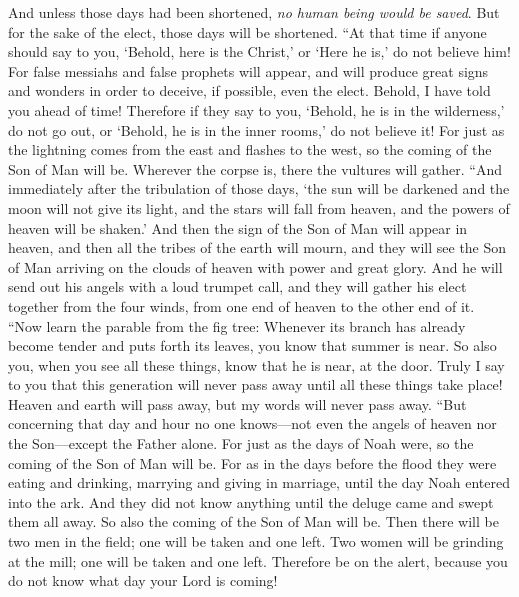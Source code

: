 \begin{biblechapter}
\verse And unless those days had been shortened, \textit{no human being would be saved}. But for the sake of the elect, those days will be shortened.
\verse “At that time if anyone should say to you, ‘Behold, here is the Christ,’ or ‘Here he is,’ do not believe him!
\verse For false messiahs and false prophets will appear, and will produce great signs and wonders in order to deceive, if possible, even the elect.
\verse Behold, I have told you ahead of time!
\verse Therefore if they say to you, ‘Behold, he is in the wilderness,’ do not go out, or ‘Behold, he is in the inner rooms,’ do not believe it!
\verse For just as the lightning comes from the east and flashes to the west, so the coming of the Son of Man will be.
\verse Wherever the corpse is, there the vultures will gather.
 “And immediately after the tribulation of those days, ‘the sun will be darkened 
and the moon will not give its light, 
and the stars will fall from heaven, 
and the powers of heaven will be shaken.’
\verse And then the sign of the Son of Man will appear in heaven, and then all the tribes of the earth will mourn, and they will see the Son of Man arriving on the clouds of heaven with power and great glory.
\verse And he will send out his angels with a loud trumpet call, and they will gather his elect together from the four winds, from one end of heaven to the other end of it.
 “Now learn the parable from the fig tree: Whenever its branch has already become tender and puts forth its leaves, you know that summer is near.
\verse So also you, when you see all these things, know that he is near, at the door.
\verse Truly I say to you that this generation will never pass away until all these things take place!
\verse Heaven and earth will pass away, but my words will never pass away.
 “But concerning that day and hour no one knows—not even the angels of heaven nor the Son—except the Father alone.
\verse For just as the days of Noah were, so the coming of the Son of Man will be.
\verse For as in the days before the flood they were eating and drinking, marrying and giving in marriage, until the day Noah entered into the ark.
\verse And they did not know anything until the deluge came and swept them all away. So also the coming of the Son of Man will be.
\verse Then there will be two men in the field; one will be taken and one left.
\verse Two women will be grinding at the mill; one will be taken and one left.
\verse Therefore be on the alert, because you do not know what day your Lord is coming!

\end{biblechapter}

